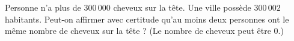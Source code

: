 Personne n'a plus de $300\,000$ cheveux sur la tête. Une ville possède
$300\,002$ habitants. Peut-on affirmer avec certitude qu'au moins deux
personnes ont le même nombre de cheveux sur la tête ? (Le nombre de
cheveux peut être $0$.)
